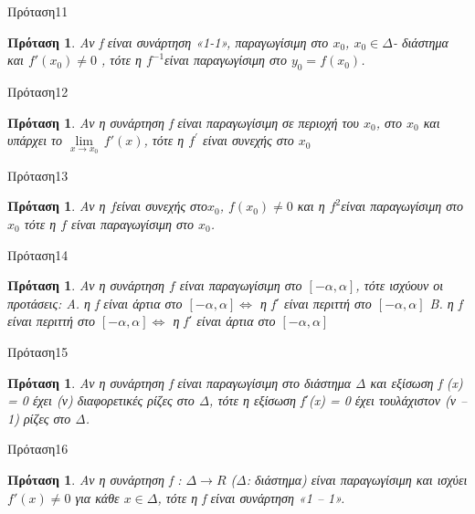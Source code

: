 \documentclass[greek]{beamer}
\newtheorem{proposition}[theorem]{Πρόταση}
\begin{document}
\begin{frame}{Πρόταση11}
 \begin{proposition}
  \normalfont Αν f είναι συνάρτηση «1-1», παραγωγίσιμη στο ${{x}_{0}}$, ${{x}_{0}}\in \Delta $- διάστημα και ${f}'({{x}_{0}})\ne 0$ , τότε η ${{f}^{-1}}$είναι παραγωγίσιμη στο ${{y}_{0}}=f({{x}_{0}})$.
 \end{proposition}
\end{frame}

\begin{frame}{Πρόταση12}
 \begin{proposition}
  \normalfont Αν η συνάρτηση f είναι παραγωγίσιμη σε περιοχή του ${{x}_{0}}$, στο ${{x}_{0}}$ και υπάρχει το $\underset{x\to {{x}_{0}}}{\mathop{\lim }}\,{f}'(x)$, τότε η ${{f}^{'}}$ είναι συνεχής στο ${{x}_{0}}$
 \end{proposition}
\end{frame}

\begin{frame}{Πρόταση13}
 \begin{proposition}
  \normalfont Αν η $f$είναι συνεχής στο${{x}_{0}}$, $f({{x}_{0}})\ne 0$ και η ${{f}^{2}}$είναι παραγωγίσιμη στο ${{x}_{0}}$ τότε η $f$ είναι παραγωγίσιμη στο ${{x}_{0}}$.
 \end{proposition}
\end{frame}

\begin{frame}{Πρόταση14}
 \begin{proposition}
  \normalfont Αν η συνάρτηση $f$ είναι παραγωγίσιμη στο $[-α, α]$, τότε ισχύουν οι προτάσεις:
  Α. η f είναι άρτια στο $[-α, α] \Leftrightarrow $ η f΄ είναι περιττή στο $[-α, α]$
  Β. η f είναι περιττή στο $[-α, α] \Leftrightarrow $ η f΄ είναι άρτια στο $[-α, α]$
 \end{proposition}
\end{frame}

\begin{frame}{Πρόταση15}
 \begin{proposition}
  \normalfont Αν η συνάρτηση f είναι παραγωγίσιμη στο διάστημα Δ και εξίσωση f (x) = 0 έχει (ν) διαφορετικές ρίζες στο Δ, τότε η εξίσωση f΄(x) = 0 έχει τουλάχιστον (ν – 1) ρίζες στο Δ.
 \end{proposition}
\end{frame}

\begin{frame}{Πρόταση16}
 \begin{proposition}
  \normalfont Αν η συνάρτηση f : $\Delta \to R$ (Δ: διάστημα) είναι παραγωγίσιμη και ισχύει ${f}'(x)\ne 0$ για κάθε $x\in \Delta $, τότε η f είναι συνάρτηση «1 – 1».
 \end{proposition}
\end{frame}
\end{document}

